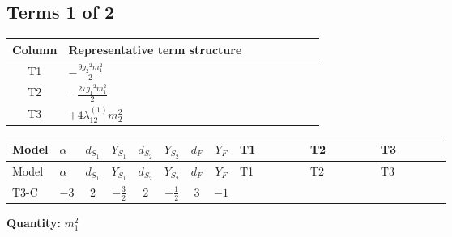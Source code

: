 \documentclass[8pt]{article}
\begin{document}
\begin{landscape}
\subsection*{Terms 1 of 2}
\begin{center}
\begin{tabular}{@{}c >{\raggedright\arraybackslash}p{0.82\linewidth}@{}}
\toprule
Column & Representative term structure \\
\midrule
T1 & \(\displaystyle -\frac{9 {g_2}^2 {m_1^2}}{2}\) \\
\midrule
T2 & \(\displaystyle -\frac{27 {g_1}^2 {m_1^2}}{2}\) \\
\midrule
T3 & \(\displaystyle +4 {\lambda_{12}^{(1)}} {m_2^2}\) \\
\midrule
\bottomrule
\end{tabular}
\end{center}
\smallskip
\tiny
\begin{longtable}{@{}llcccccc >{\raggedright\arraybackslash}p{0.21\linewidth} >{\raggedright\arraybackslash}p{0.21\linewidth} >{\raggedright\arraybackslash}p{0.21\linewidth}@{}}
\toprule
Model & $\alpha$ & $d_{S_1}$ & $Y_{S_1}$ & $d_{S_2}$ & $Y_{S_2}$ & $d_F$ & $Y_F$ & T1 & T2 & T3 \\
\midrule
\endfirsthead
\toprule
Model & $\alpha$ & $d_{S_1}$ & $Y_{S_1}$ & $d_{S_2}$ & $Y_{S_2}$ & $d_F$ & $Y_F$ & T1 & T2 & T3 \\
\midrule
\endhead
T3-C & $-3$ & $2$ & $-\frac{3}{2}$ & $2$ & $-\frac{1}{2}$ & $3$ & $-1$ & \scriptsize\adjustbox{max width=\linewidth}{$\begin{gathered} -\frac{9 {g_2}^2 {m_1^2}}{2}\end{gathered}$} & \scriptsize\adjustbox{max width=\linewidth}{$\begin{gathered} -\frac{27 {g_1}^2 {m_1^2}}{2}\end{gathered}$} & \scriptsize\adjustbox{max width=\linewidth}{$\begin{gathered} +4 {\lambda_{12}^{(1)}} {m_2^2}\end{gathered}$} \\
\midrule
\bottomrule
\end{longtable}
\clearpage
\noindent\textbf{Quantity: }$m_1^2$\par\smallskip

\end{landscape}
\end{document}
